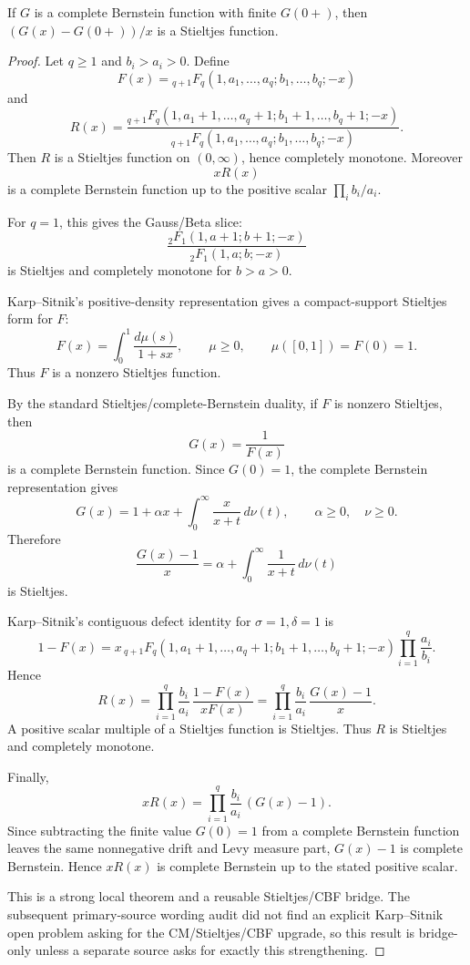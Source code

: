 \begin{lemma}
\label{res:cbf-difference-quotient-stieltjes}
If \(G\) is a complete Bernstein function with finite \(G(0+)\), then \((G(x)-G(0+))/x\) is a Stieltjes function.
\end{lemma}
\begin{proof}
Let \(q\ge1\) and \(b_i>a_i>0\). Define
\[
F(x)={}_{q+1}F_q(1,a_1,\ldots,a_q;b_1,\ldots,b_q;-x)
\]
and
\[
R(x)=
\frac{{}_{q+1}F_q(1,a_1+1,\ldots,a_q+1;b_1+1,\ldots,b_q+1;-x)}
{{}_{q+1}F_q(1,a_1,\ldots,a_q;b_1,\ldots,b_q;-x)}.
\]
Then \(R\) is a Stieltjes function on \((0,\infty)\), hence completely monotone. Moreover
\[
xR(x)
\]
is a complete Bernstein function up to the positive scalar \(\prod_i b_i/a_i\).

For \(q=1\), this gives the Gauss/Beta slice:
\[
\frac{{}_2F_1(1,a+1;b+1;-x)}{{}_2F_1(1,a;b;-x)}
\]
is Stieltjes and completely monotone for \(b>a>0\).

Karp--Sitnik's positive-density representation gives a compact-support Stieltjes form for \(F\):
\[
F(x)=\int_0^1 \frac{d\mu(s)}{1+sx},
\qquad \mu\ge0,
\qquad \mu([0,1])=F(0)=1.
\]
Thus \(F\) is a nonzero Stieltjes function.

By the standard Stieltjes/complete-Bernstein duality, if \(F\) is nonzero Stieltjes, then
\[
G(x)=\frac1{F(x)}
\]
is a complete Bernstein function. Since \(G(0)=1\), the complete Bernstein representation gives
\[
G(x)=1+\alpha x+\int_0^\infty \frac{x}{x+t}\,d\nu(t),
\qquad \alpha\ge0,\quad \nu\ge0.
\]
Therefore
\[
\frac{G(x)-1}{x}
=\alpha+\int_0^\infty \frac{1}{x+t}\,d\nu(t)
\]
is Stieltjes.

Karp--Sitnik's contiguous defect identity for \(\sigma=1,\delta=1\) is
\[
1-F(x)
=x\,{}_{q+1}F_q(1,a_1+1,\ldots,a_q+1;b_1+1,\ldots,b_q+1;-x)
\prod_{i=1}^q\frac{a_i}{b_i}.
\]
Hence
\[
R(x)=
\prod_{i=1}^q\frac{b_i}{a_i}\,
\frac{1-F(x)}{xF(x)}
=
\prod_{i=1}^q\frac{b_i}{a_i}\,
\frac{G(x)-1}{x}.
\]
A positive scalar multiple of a Stieltjes function is Stieltjes. Thus \(R\) is Stieltjes and completely monotone.

Finally,
\[
xR(x)=\prod_{i=1}^q\frac{b_i}{a_i}\,(G(x)-1).
\]
Since subtracting the finite value \(G(0)=1\) from a complete Bernstein function leaves the same nonnegative drift and Levy measure part, \(G(x)-1\) is complete Bernstein. Hence \(xR(x)\) is complete Bernstein up to the stated positive scalar.

This is a strong local theorem and a reusable Stieltjes/CBF bridge. The subsequent primary-source wording audit did not find an explicit Karp--Sitnik open problem asking for the CM/Stieltjes/CBF upgrade, so this result is bridge-only unless a separate source asks for exactly this strengthening.
\end{proof}

